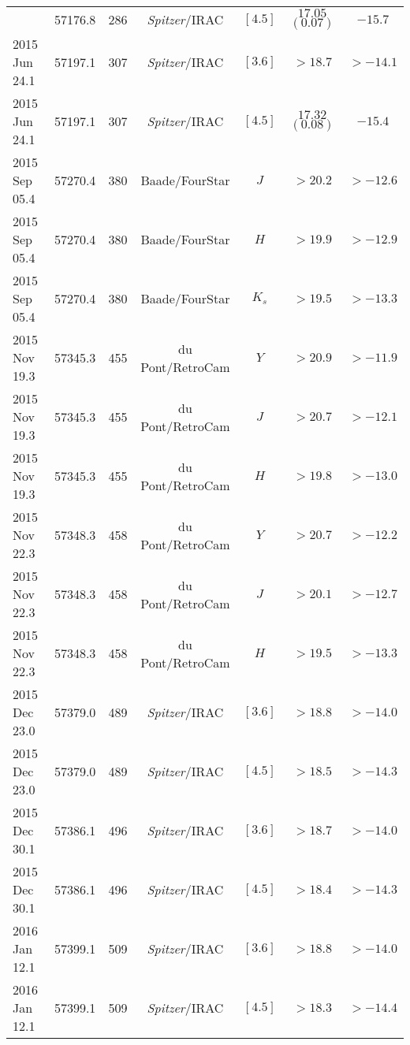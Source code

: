 \begin{tabular}{lcccccc}
{2015 Jun 03.8 & 57176.8 & 286 & \textit{Spitzer}/IRAC & $[4.5]$ & $17.05$ $(0.07)$ & $-15.7$ \\
2015 Jun 24.1 & 57197.1 & 307 & \textit{Spitzer}/IRAC & $[3.6]$ & $>18.7$ & $>-14.1$ \\
2015 Jun 24.1 & 57197.1 & 307 & \textit{Spitzer}/IRAC & $[4.5]$ & $17.32$ $(0.08)$ & $-15.4$ \\
2015 Sep 05.4 & 57270.4 & 380 & Baade/FourStar & $J$ & $>20.2$ & $>-12.6$ \\
2015 Sep 05.4 & 57270.4 & 380 & Baade/FourStar & $H$ & $>19.9$ & $>-12.9$ \\
2015 Sep 05.4 & 57270.4 & 380 & Baade/FourStar & $K_s$ & $>19.5$ & $>-13.3$ \\
2015 Nov 19.3 & 57345.3 & 455 & du Pont/RetroCam & $Y$ & $>20.9$ & $>-11.9$ \\
2015 Nov 19.3 & 57345.3 & 455 & du Pont/RetroCam & $J$ & $>20.7$ & $>-12.1$ \\
2015 Nov 19.3 & 57345.3 & 455 & du Pont/RetroCam & $H$ & $>19.8$ & $>-13.0$ \\
2015 Nov 22.3 & 57348.3 & 458 & du Pont/RetroCam & $Y$ & $>20.7$ & $>-12.2$ \\
2015 Nov 22.3 & 57348.3 & 458 & du Pont/RetroCam & $J$ & $>20.1$ & $>-12.7$ \\
2015 Nov 22.3 & 57348.3 & 458 & du Pont/RetroCam & $H$ & $>19.5$ & $>-13.3$ \\
2015 Dec 23.0 & 57379.0 & 489 & \textit{Spitzer}/IRAC & $[3.6]$ & $>18.8$ & $>-14.0$ \\
2015 Dec 23.0 & 57379.0 & 489 & \textit{Spitzer}/IRAC & $[4.5]$ & $>18.5$ & $>-14.3$ \\
2015 Dec 30.1 & 57386.1 & 496 & \textit{Spitzer}/IRAC & $[3.6]$ & $>18.7$ & $>-14.0$ \\
2015 Dec 30.1 & 57386.1 & 496 & \textit{Spitzer}/IRAC & $[4.5]$ & $>18.4$ & $>-14.3$ \\
2016 Jan 12.1 & 57399.1 & 509 & \textit{Spitzer}/IRAC & $[3.6]$ & $>18.8$ & $>-14.0$ \\
2016 Jan 12.1 & 57399.1 & 509 & \textit{Spitzer}/IRAC & $[4.5]$ & $>18.3$ & $>-14.4$ \\
\end{tabular}